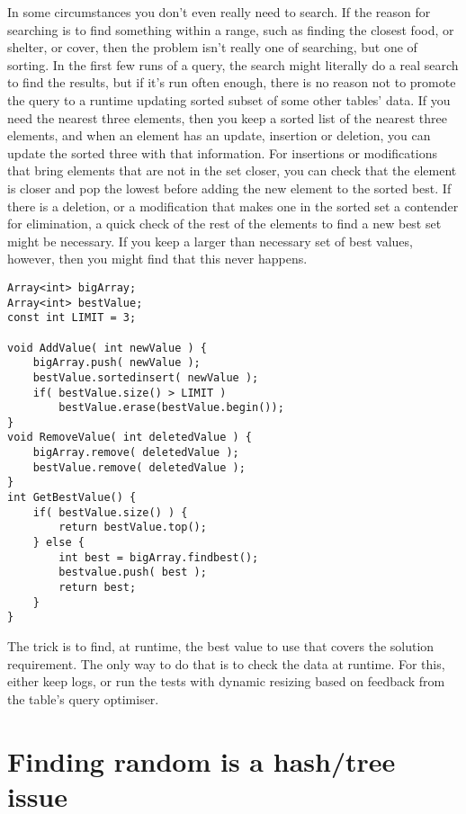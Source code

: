 In some circumstances you don't even really need to search. If the reason for
searching is to find something within a range, such as finding the closest
food, or shelter, or cover, then the problem isn't really one of searching, but
one of sorting. In the first few runs of a query, the search might literally do
a real search to find the results, but if it's run often enough, there is no
reason not to promote the query to a runtime updating sorted subset of some
other tables' data. If you need the nearest three elements, then you keep a
sorted list of the nearest three elements, and when an element has an update,
insertion or deletion, you can update the sorted three with that information.
For insertions or modifications that bring elements that are not in the set
closer, you can check that the element is closer and pop the lowest before
adding the new element to the sorted best. If there is a deletion, or a
modification that makes one in the sorted set a contender for elimination, a
quick check of the rest of the elements to find a new best set might be
necessary. If you keep a larger than necessary set of best values, however,
then you might find that this never happens.

\begin{lstlisting}[caption=keeping more than you need]
Array<int> bigArray;
Array<int> bestValue;
const int LIMIT = 3;

void AddValue( int newValue ) {
	bigArray.push( newValue );
	bestValue.sortedinsert( newValue );
	if( bestValue.size() > LIMIT )
		bestValue.erase(bestValue.begin());
}
void RemoveValue( int deletedValue ) {
	bigArray.remove( deletedValue );
	bestValue.remove( deletedValue );
}
int GetBestValue() {
	if( bestValue.size() ) {
		return bestValue.top();
	} else {
		int best = bigArray.findbest();
		bestvalue.push( best );
		return best;
	}
}
\end{lstlisting}

The trick is to find, at runtime, the best value to use that covers the
solution requirement. The only way to do that is to check the data at runtime.
For this, either keep logs, or run the tests with dynamic resizing based on
feedback from the table's query optimiser.

\section[Finding random]{Finding random is a hash/tree issue}

